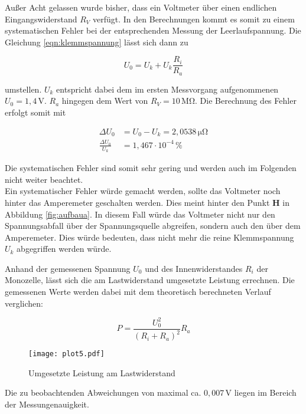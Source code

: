 \noindent Außer Acht gelassen wurde bisher, dass ein Voltmeter über einen endlichen Eingangswiderstand $R_V$ verfügt.
In den Berechnungen kommt es somit zu einem systematischen Fehler bei der entsprechenden Messung der Leerlaufspannung.
Die Gleichung \ref{eqn:klemmspannung} lässt sich dann zu

\begin{equation}
  U_0 = U_k + U_k\frac{R_i}{R_a}
\end{equation}

\noindent umstellen.
$U_k$ entspricht dabei dem im ersten Messvorgang aufgenommenen $U_0 = 1,4 \,\si{\volt}$.
$R_a$ hingegen dem Wert von $R_V = 10 \, \si{\mega\ohm}$.
Die Berechnung des Fehler erfolgt somit mit

\begin{align*}
  \Delta U_0 &= U_0 - U_k = 2,0538 \, \si{\micro\ohm} \\
  \frac{\Delta U_0}{U_k} &= 1,467 \cdot 10^{-4} \, \%
\end{align*}

\noindent Die systematischen Fehler sind somit sehr gering und werden auch im Folgenden nicht weiter beachtet. \\
Ein systematischer Fehler würde gemacht werden, sollte das Voltmeter noch hinter das Amperemeter geschalten werden.
Dies meint hinter den Punkt \textbf{H} in Abbildung \ref{fig:aufbaua}.
In diesem Fall würde das Voltmeter nicht nur den Spannungsabfall über der Spannungsquelle abgreifen, sondern auch den über dem Amperemeter.
Dies würde bedeuten, dass nicht mehr die reine Klemmspannung $U_k$ abgegriffen werden würde.

\newpage

\noindent Anhand der gemessenen Spannung $U_0$ und des Innenwiderstandes $R_i$ der Monozelle, lässt sich die am Lastwiderstand umgesetzte Leistung errechnen.
Die gemessenen Werte werden dabei mit dem theoretisch berechneten Verlauf verglichen:

\begin{equation}
  P = \frac{U_0^2}{(R_i + R_a)^2} R_a
\end{equation}

\begin{figure}[H]
  \centering
  \texttt{[image: plot5.pdf]}
  \caption{Umgesetzte Leistung am Lastwiderstand}
  \label{fig:leistung}
\end{figure}

\noindent Die zu beobachtenden Abweichungen von maximal ca. $0,007 \,\mathrm{V}$ liegen im Bereich der Messungenauigkeit.
